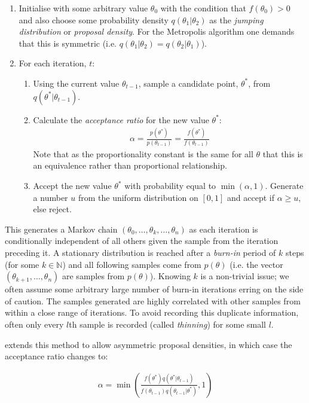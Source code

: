 \documentclass[12pt]{article} %
\begin{document}
\begin{enumerate}
	\item Initialise with some arbitrary value $\theta_0$ with the condition that $f(\theta_0) > 0$ and also choose some probability density $q(\theta_1|\theta_2)$ as the \emph{jumping distribution} or \emph{proposal density}. For the Metropolis algorithm one demands that this is symmetric (i.e. $q(\theta_1 | \theta_2) = q(\theta_2 | \theta_1)$).
	\item For each iteration, $t$:
	\begin{enumerate}
		\item Using the current value $\theta_{t-1}$, sample a candidate point, $\theta^*$, from  $q(\theta^* | \theta_{t-1})$.
		\item Calculate the \emph{acceptance ratio} for the new value $\theta^*$:
		\begin{align}
		\alpha = \frac{p(\theta^*)}{p(\theta_{t-1})} = \frac{f(\theta^*)}{f(\theta_{t-1})}
		\end{align}
		Note that as the proportionality constant is the same for all $\theta$ that this is an equivalence rather than proportional relationship.
		\item Accept the new value $\theta^*$ with probability equal to $\min(\alpha, 1)$. Generate a number $u$ from the uniform distribution on $[0,1]$ and accept if $\alpha \geq u$, else reject.
	\end{enumerate}
\end{enumerate}
This generates a Markov chain $(\theta_0,\ldots,\theta_k,\ldots, \theta_n)$ as each iteration is conditionally independent of all others given the sample from the iteration preceding it. A stationary distribution is reached after a \emph{burn-in} period of $k$ steps (for some $k \in \mathbb{N}$) and all following samples come from $p(\theta)$ (i.e. the vector $(\theta_{k+1},\ldots,\theta_n)$ are samples from $p(\theta)$). Knowing $k$ is a non-trivial issue; we often assume some arbitrary large number of burn-in iterations erring on the side of caution. The samples generated are highly correlated with other samples from within a close range of iterations. To avoid recording this duplicate information, often only every $l$th sample is recorded (called \emph{thinning}) for some small $l$.

\citet{HastingsMonteCarloSampling} extends this method to allow asymmetric proposal densities, in which case the acceptance ratio changes to:

\begin{align} \label{metropolis_hastings_alpha}
\alpha = \min\left(\frac{f(\theta^*) q(\theta^*|\theta_{t-1})}{f(\theta_{t-1})q(\theta_{t-1}|\theta^*)}, 1\right)
\end{align}
\end{document}
